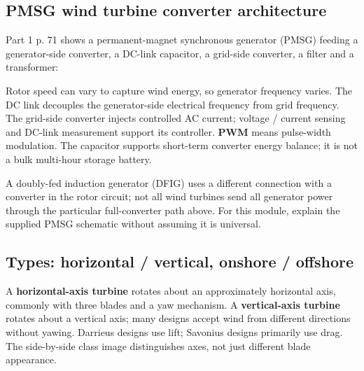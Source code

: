 \documentclass[11pt,a4paper]{article}
\begin{document}
\subsection{PMSG wind turbine converter architecture}
Part 1 p. 71 shows a permanent-magnet synchronous generator (PMSG) feeding a generator-side converter, a DC-link capacitor, a grid-side converter, a filter and a transformer:
\begin{center}
\end{center}
Rotor speed can vary to capture wind energy, so generator frequency varies. The DC link decouples the generator-side electrical frequency from grid frequency. The grid-side converter injects controlled AC current; voltage / current sensing and DC-link measurement support its controller. \textbf{PWM} means pulse-width modulation. The capacitor supports short-term converter energy balance; it is not a bulk multi-hour storage battery.

A doubly-fed induction generator (DFIG) uses a different connection with a converter in the rotor circuit; not all wind turbines send all generator power through the particular full-converter path above. For this module, explain the supplied PMSG schematic without assuming it is universal.

\subsection{Types: horizontal / vertical, onshore / offshore}
A \textbf{horizontal-axis turbine} rotates about an approximately horizontal axis, commonly with three blades and a yaw mechanism. A \textbf{vertical-axis turbine} rotates about a vertical axis; many designs accept wind from different directions without yawing. Darrieus designs use lift; Savonius designs primarily use drag. The side-by-side class image distinguishes axes, not just different blade appearance.
\end{document}

